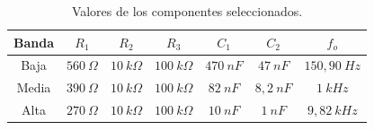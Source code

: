 \documentclass[a4paper]{article}
\begin{document}
\begin{table}[H]
\begin{center}
\begin{tabular}{ccccccc}
\hline
Banda & $R_1$ & $R_2$ & $R_3$ & $C_1$ & $C_2$ & $f_o$ \\
\hline
Baja & $560 \ \Omega$ & $10 \ k\Omega$ & $100 \ k\Omega$ & $470 \ nF$ & $47 \ nF$ & $150,90 \ Hz$ \\
Media & $390 \ \Omega$ & $10 \ k\Omega$ & $100 \ k\Omega$ & $82 \ nF$ & $8,2 \ nF$ & $1 \ kHz$ \\
Alta & $270 \ \Omega$ & $10 \ k\Omega$ & $100 \ k\Omega$ & $10 \ nF$ & $1 \ nF$ & $9,82 \ kHz$\\
\hline
\end{tabular}
\caption{Valores de los componentes seleccionados.}
\end{center}
\end{table}
\end{document}
